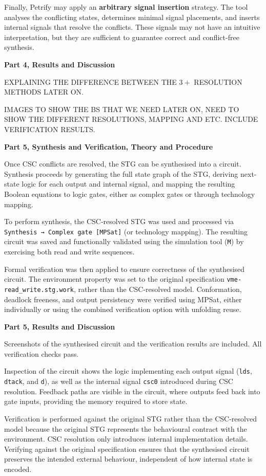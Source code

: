 \documentclass[a4paper,12pt]{article}
\begin{document}
Finally, Petrify may apply an \textbf{arbitrary signal insertion} strategy. The tool analyses the conflicting states, determines minimal signal placements, and inserts internal signals that resolve the conflicts. These signals may not have an intuitive interpretation, but they are sufficient to guarantee correct and conflict-free synthesis.

\textbf{Part 4, Results and Discussion}

EXPLAINING THE DIFFERENCE BETWEEN THE $3+$ RESOLUTION METHODS LATER ON.

IMAGES TO SHOW THE BS THAT WE NEED LATER ON, NEED TO SHOW THE DIFFERENT RESOLUTIONS, MAPPING AND ETC. INCLUDE VERIFICATION RESULTS.

\textbf{Part 5, Synthesis and Verification, Theory and Procedure}

Once CSC conflicts are resolved, the STG can be synthesised into a circuit. Synthesis proceeds by generating the full state graph of the STG, deriving next-state logic for each output and internal signal, and mapping the resulting Boolean equations to logic gates, either as complex gates or through technology mapping.

To perform synthesis, the CSC-resolved STG was used and processed via \texttt{Synthesis → Complex gate [MPSat]} (or technology mapping). The resulting circuit was saved and functionally validated using the simulation tool (\texttt{M}) by exercising both read and write sequences.

Formal verification was then applied to ensure correctness of the synthesised circuit. The environment property was set to the original specification \texttt{vme-read\_write.stg.work}, rather than the CSC-resolved model. Conformation, deadlock freeness, and output persistency were verified using MPSat, either individually or using the combined verification option with unfolding reuse.

\textbf{Part 5, Results and Discussion}

Screenshots of the synthesised circuit and the verification results are included. All verification checks pass.

Inspection of the circuit shows the logic implementing each output signal (\texttt{lds}, \texttt{dtack}, and \texttt{d}), as well as the internal signal \texttt{csc0} introduced during CSC resolution. Feedback paths are visible in the circuit, where outputs feed back into gate inputs, providing the memory required to store state.

Verification is performed against the original STG rather than the CSC-resolved model because the original STG represents the behavioural contract with the environment. CSC resolution only introduces internal implementation details. Verifying against the original specification ensures that the synthesised circuit preserves the intended external behaviour, independent of how internal state is encoded.
\end{document}
